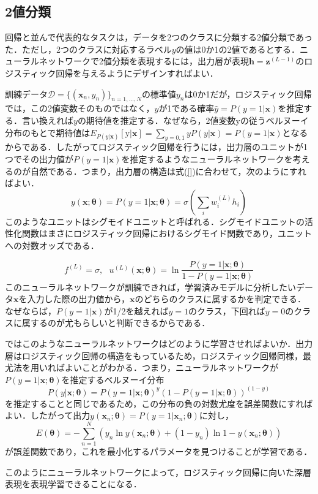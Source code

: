 \documentclass[a4paper,11pt]{jsreport}
\begin{document}
\subsection*{2値分類}
回帰と並んで代表的なタスクは，データを2つのクラスに分類する2値分類であった．ただし，2つのクラスに対応するラベル$y$の値は0か1の2値であるとする．ニューラルネットワークで2値分類を表現するには，出力層が表現$\bm{h} = \bm{z}^{(L-1)}$のロジスティック回帰を与えるようにデザインすればよい．\par
訓練データ$\mathcal{D} = \{ (\bm{x}_n, y_n) \}_{n=1,\dots ,N}$の標準値$y_n$は0か1だが，ロジスティック回帰では，この2値変数そのものではなく，$y$が1である確率$\hat{y} = P(y=1 | \bm{x})$を推定する．言い換えれば$y$の期待値を推定する．なぜなら，2値変数$\mathrm{y}$の従うベルヌーイ分布のもとで期待値は$E_{P(y | \bm{x})}[\mathrm{y} | \bm{x}] = \sum_{y=0,1} y P(y | \bm{x}) = P(y=1 | \bm{x})$となるからである．したがってロジスティック回帰を行うには，出力層のユニットが1つでその出力値が$P(y=1 | \bm{x})$を推定するようなニューラルネットワークを考えるのが自然である．つまり，出力層の構造は式(\ref{})に合わせて，次のようにすればよい．
\begin{equation}
  y(\bm{x}; \bm{\theta})
  = P(y=1 | \bm{x}; \bm{\theta})
  = \sigma\left( \sum_i w_i^{(L)} h_i \right)
\end{equation}
このようなユニットはシグモイドユニットと呼ばれる．シグモイドユニットの活性化関数はまさにロジスティック回帰におけるシグモイド関数であり，ユニットへの対数オッズである．\par
\begin{equation}
  f^{(L)} = \sigma, \ \ \
  u^{(L)}(\bm{x}; \bm{\theta}) = \ln{\frac{P(y=1 | \bm{x}; \bm{\theta})}{1 - P(y=1 | \bm{x}; \bm{\theta})}}
\end{equation}
このニューラルネットワークが訓練できれば，学習済みモデルに分析したいデータ$\bm{x}$を入力した際の出力値から，$\bm{x}$のどちらのクラスに属するかを判定できる．なぜならば，$P(y=1 | \bm{x})$が1/2を越えれば$y=1$のクラス，下回れば$y=0$のクラスに属するのが尤もらしいと判断できるからである．\par
ではこのようなニューラルネットワークはどのように学習させればよいか．出力層はロジスティック回帰の構造をもっているため，ロジスティック回帰同様，最尤法を用いればよいことがわかる．つまり，ニューラルネットワークが$P(y=1 | \bm{x};\bm{\theta})$を推定するベルヌーイ分布
\begin{equation}
  P(y | \bm{x}; \bm{\theta})
  = P(y = 1 | \bm{x}; \bm{\theta})^y (1 - P(y = 1 | \bm{x}; \bm{\theta}))^{(1-y)}
\end{equation}
を推定することと同じであるため，この分布の負の対数尤度を誤差関数にすればよい．したがって出力$y(\bm{x}_n; \bm{\theta}) = P(y=1 | \bm{x}_n; \bm{\theta})$に対し，
\begin{equation}
  E(\bm{\theta})
  = -\sum_{n=1}^N \left( y_n \ln{y(\bm{x}_n; \bm{\theta})}
  + (1 - y_n) \ln{1 - y(\bm{x}_n; \bm{\theta})} \right)
\end{equation}
が誤差関数であり，これを最小化するパラメータを見つけることが学習である．\par
このようにニューラルネットワークによって，ロジスティック回帰に向いた深層表現を表現学習できることになる．
\end{document}
